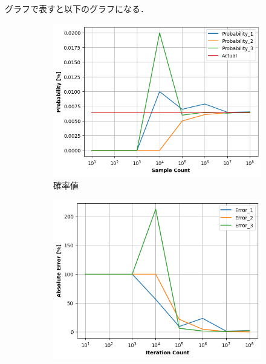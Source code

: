 \documentclass[a4j, titlepage]{jarticle}
\begin{document}
        グラフで表すと以下のグラフになる．

        \begin{figure}[htb]
          \begin{subfigure}[b]{0.38\textwidth}
              \centering
              \includegraphics[height=\textwidth]{../Dir_Dice/img_result5.png}
              \caption{確率値}
              \label{fig:dic5}
          \end{subfigure}
          \hspace{50pt}
          \begin{subfigure}[b]{0.38\textwidth}
            \includegraphics[height=\textwidth]{../Dir_Dice/img_error5.png}

\end{subfigure}
\end{figure}
\end{document}

